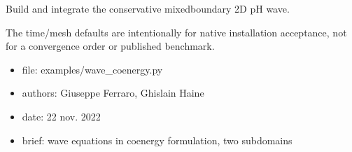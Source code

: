 \documentclass[letterpaper,10pt,english]{sphinxmanual}
\begin{document}
\begin{fulllineitems}

\pysigstartsignatures
\pysiglinewithargsret
{}
{\sphinxparamcomma {}\sphinxparamcomma {}\sphinxparamcomma {}\sphinxparamcomma {}}
{}
\pysigstopsignatures
\sphinxAtStartPar
Build and integrate the conservative mixed\sphinxhyphen{}boundary 2D pH wave.

\sphinxAtStartPar
The time/mesh defaults are intentionally for native installation
acceptance, not for a convergence order or published benchmark.

\end{fulllineitems}

\begin{itemize}
\item {} 
\sphinxAtStartPar
file:             examples/wave\_coenergy.py

\item {} 
\sphinxAtStartPar
authors:          Giuseppe Ferraro, Ghislain Haine

\item {} 
\sphinxAtStartPar
date:             22 nov. 2022

\item {} 
\sphinxAtStartPar
brief:            wave equations in co\sphinxhyphen{}energy formulation, two sub\sphinxhyphen{}domains

\end{itemize}


\begin{fulllineitems}

\pysigstartsignatures
\pysiglinewithargsret
{}
{}
{}
\pysigstopsignatures
\end{fulllineitems}
\end{document}
